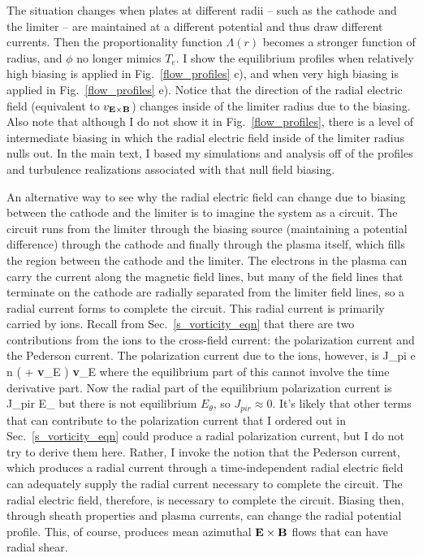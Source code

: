 The situation changes when plates at different radii -- such as the cathode and the limiter -- are maintained at a different
potential and thus draw different currents. Then the proportionality function $\Lambda(r)$ becomes a stronger function of radius, and $\phi$ no longer mimics $T_e$. 
I show the equilibrium profiles when relatively
high biasing is applied in Fig.~\ref{flow_profiles} c), and when very high biasing is applied in Fig.~\ref{flow_profiles} e). Notice that the direction of the radial electric field (equivalent
to $v_{\bf E \times B}$) changes inside of the limiter radius due to the biasing. Also note that although I do not show it in Fig.~\ref{flow_profiles}, there is a level of intermediate
biasing in which the radial electric field inside of the limiter radius nulls out. In the main text, I based my simulations and analysis off of 
the profiles and turbulence realizations associated with that null field biasing.

An alternative way to see why the radial electric field can change due to biasing between the cathode and the limiter is to imagine the system as a circuit. The circuit runs from the limiter
through the biasing source (maintaining a potential difference) through the cathode and finally through the plasma itself, which fills the region between the cathode and the limiter.
The electrons in the plasma can carry the current along the magnetic field lines, but many of the field lines that terminate on the cathode are radially separated from the limiter field lines,
so a radial current forms to complete the circuit. This radial current is primarily carried by ions. Recall from Sec.~\ref{s_vorticity_eqn} that there are two contributions from the ions
to the cross-field current: the polarization current and the Pederson current. The polarization current due to the ions, however, is
\beq
\label{pol_curr}
J_{pi} \approx e n  \times \left( \pdt + {\bf v}_E \cdot \grad \right) {\bf v}_E
\eeq
where the equilibrium part of this cannot involve the time derivative part. Now the radial part of the equilibrium polarization current is
\beq
\label{rad_pol_curr}
J_{pir} \approx {} E_\theta {}
\eeq
but there is not equilibrium $E_\theta$, so $J_{pir} \approx 0$. It's likely that other terms that can contribute to the polarization current that I ordered out in Sec.~\ref{s_vorticity_eqn}
could produce a radial polarization current, but I do not try to derive them here. Rather, I invoke the notion that the Pederson current,
which produces a radial current through a time-independent radial electric field can adequately supply the radial current necessary to complete the circuit. The radial electric field, therefore, is
necessary to complete the circuit. Biasing then, through sheath properties and plasma currents, can change the radial potential profile.
This, of course, produces mean azimuthal ${\bf E \times B}$ flows that can have radial shear.

